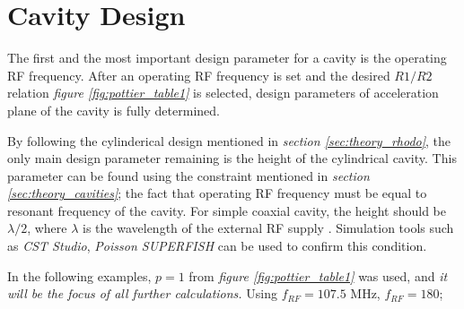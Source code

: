 \documentclass{article}
\begin{document}
\newcommand{\vecthreeBF}[1]{\vec{\textbf{#1}}}
\newcommand{\vecthree}[1]{\vec{#1}}

\newcommand{\parDeriv}[2]{\frac{\partial #1}{\partial #2}}
\newcommand{\parDerivS}[2]{\frac{\partial^2 #1}{\partial #2^2}}
\newcommand{\derivS}[2]{\frac{d^2 #1}{d#2^2}}

\newcommand{\dotProdBF}[2]{\vecthreeBF{#1} \cdot \vecthreeBF{#2}}
\newcommand{\dotProd}[2]{\vecthree{#1} \cdot \vecthree{#2}}

\newcommand{\crossProdBF}[2]{\vecthreeBF{#1} \times \vecthreeBF{#2}}
\newcommand{\crossProd}[2]{\vecthree{#1} \times \vecthree{#2}}


\newcommand{\fromeq}[1]{\textit{equation \ref{eq:#1}}}
\newcommand{\fromeqs}[2]{\textit{equations \ref{eq:#1} and \ref{eq:#2}}}

\newcommand{\fromfig}[1]{\textit{figure \ref{fig:#1}}}
\newcommand{\fromfigs}[2]{\textit{figures \ref{fig:#1} and \ref{fig:#2}}}
\newcommand{\fromsec}[1]{\textit{section \ref{sec:#1}}}



\section{Cavity Design}

The first and the most important design parameter for a cavity is the operating RF frequency.
After an operating RF frequency is set and the desired $R1/R2$ relation \fromfig{pottier_table1} is selected, design parameters of acceleration plane of the cavity is fully determined.

By following the cylinderical design mentioned in \fromsec{theory_rhodo}, the only main design parameter remaining is the height of the cylindrical cavity.
This parameter can be found using the constraint mentioned in \fromsec{theory_cavities}; the fact that operating RF frequency must be equal to resonant frequency of the cavity.
For simple coaxial cavity, the height should be $\lambda/2$, where $\lambda$ is the wavelength of the external RF supply \cite{rhodo_pottier}.
Simulation tools such as \textit{CST Studio}, \textit{Poisson SUPERFISH} can be used to confirm this condition.

In the following examples, $p=1$ from \fromfig{pottier_table1} was used, and \textit{it will be the focus of all further calculations.}
Using $f_{RF}=107.5$ MHz, $f_{RF}=180$;
\end{document}
